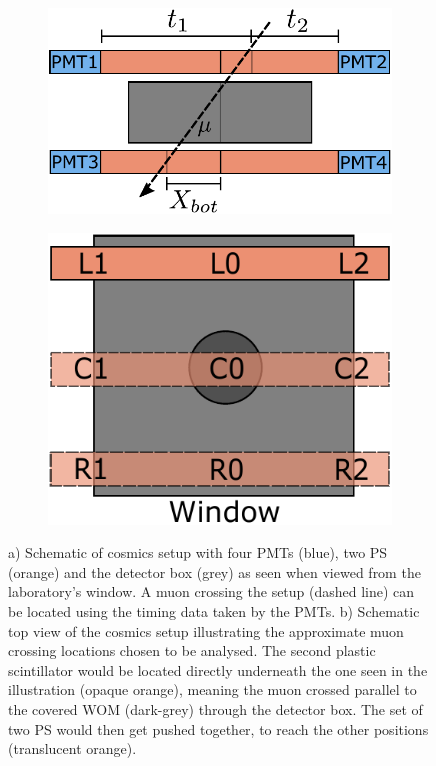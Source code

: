 	\begin{figure}[h]
		\centering
		\begin{subfigure}{.5\textwidth}
			\centering			
			\includegraphics[width=\textwidth]{pictures/positional.pdf}
			\caption{}
			\label{fig:time-difference}
		\end{subfigure}%
		\begin{subfigure}{.5\textwidth}
			\centering
			\includegraphics[width=.7\textwidth]{pictures/locations_cosmics.pdf}
			\caption{}
			\label{fig:locations-cosmics}
		\end{subfigure}	
	
	\caption{a) Schematic of cosmics setup with four \acsp{PMT} (blue), two \ac{PS} (orange) and the detector box (grey) as seen when viewed from the laboratory's window. A muon crossing the setup (dashed line) can be located using the timing data taken by the \acsp{PMT}. b) Schematic top view of the cosmics setup illustrating the approximate muon crossing locations chosen to be analysed. The second plastic scintillator would be located directly underneath the one seen in the illustration (opaque orange), meaning the muon crossed parallel to the covered \ac{WOM} (dark-grey) through the detector box. The set of two \ac{PS} would then get pushed together, to reach the other positions (translucent orange). }	
	\end{figure}

